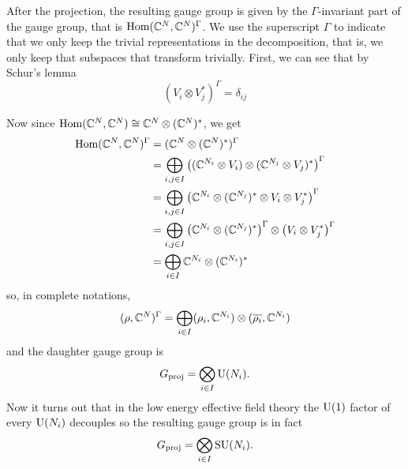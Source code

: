         After the projection, the resulting gauge group is given by the $\Gamma$-invariant part of the gauge group, that is $\text{Hom}(\mathbb{C}^N,\mathbb{C}^N)^\Gamma$. We use the superscript $\Gamma$ to indicate that we only keep the trivial representations in the decomposition, that is, we only keep that subspaces that transform trivially. First, we can see that by Schur's lemma \marker
        \begin{equation}
            (V_i\otimes V^*_j)^\Gamma=\delta_{ij}
        \end{equation}
        
        Now since $\text{Hom}(\mathbb{C}^N,\mathbb{C}^N)\cong\mathbb{C}^N\otimes(\mathbb{C}^N)^*$, we get
        \begin{align}
            \text{Hom}(\mathbb{C}^N,\mathbb{C}^N)^\Gamma &= (\mathbb{C}^N\otimes(\mathbb{C}^N)^*)^\Gamma\\
            &= \bigoplus_{i,j\in I} \left((\mathbb{C}^{N_i}\otimes V_i)\otimes(\mathbb{C}^{N_j}\otimes V_j)^*\right)^\Gamma\\
            &= \bigoplus_{i,j\in I} \left(\mathbb{C}^{N_i}\otimes(\mathbb{C}^{N_j})^*\otimes V_i\otimes V^*_j\right)^\Gamma\\
            &= \bigoplus_{i,j\in I} \left(\mathbb{C}^{N_i}\otimes(\mathbb{C}^{N_j})^*\right)^\Gamma\otimes\left(V_i\otimes V^*_j\right)^\Gamma\\
            &= \bigoplus_{i\in I}\mathbb{C}^{N_i}\otimes(\mathbb{C}^{N_i})^*
        \end{align}
        so, in complete notations,
        \begin{equation}
            (\rho,\mathbb{C}^N)^\Gamma = \bigoplus_{i\in I}(\rho_i,\mathbb{C}^{N_i})\otimes(\overline{\rho_i},\mathbb{C}^{N_i})
        \end{equation}
        and the daughter gauge group is
        \begin{equation}
            G_{\text{proj}} = \bigotimes_{i\in I}\text{U}(N_i).
        \end{equation}
        Now it turns out that in the low energy effective field theory the $\text{U}(1)$ factor of every $\text{U}(N_i)$ decouples \marker so the resulting gauge group is in fact
        \begin{equation}
            G_{\text{proj}} = \bigotimes_{i\in I}\text{SU}(N_i).
        \end{equation}

